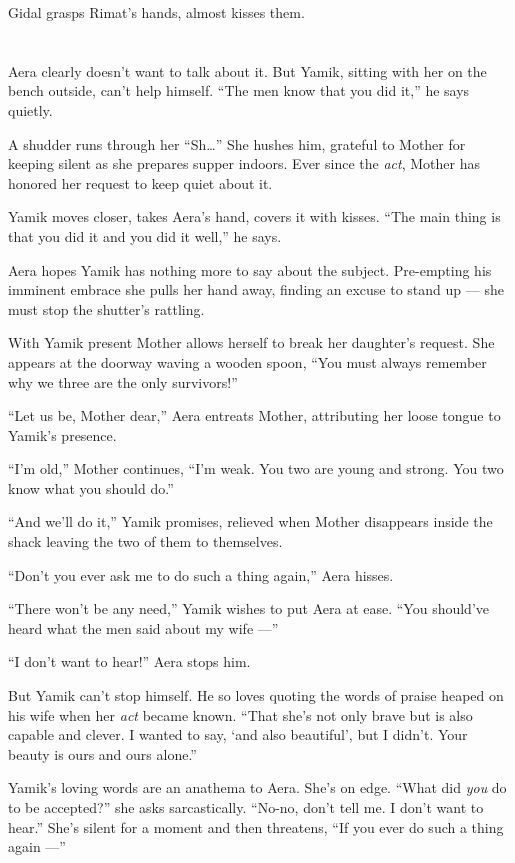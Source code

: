 \documentclass[twoside,11pt,openany]{book}
\begin{document}
Gidal grasps Rimat's hands, almost kisses them.


\bigskip

\chapter{}

Aera clearly doesn't want to talk about it. But Yamik, sitting with her on the bench outside, can't help
himself.  ``The men know that you did it,'' he says quietly.

A shudder runs through her ``Sh{\ldots}''  She hushes him, grateful to Mother for keeping
silent as she prepares supper indoors.  Ever since the \textit{act}, Mother
has honored her request to keep quiet
about it.

Yamik moves closer, takes Aera's hand, covers it with kisses. ``The main thing is that you did it and you
did it well,'' he says.

Aera hopes Yamik has nothing more to say about the subject. Pre-empting his imminent embrace she pulls her hand away,
finding an excuse to stand up --- she must stop the shutter's rattling.

With Yamik present Mother allows herself to break her daughter's request. She appears at the doorway waving a wooden
spoon, ``You must always remember why we three are the only survivors!''

``Let us be, Mother dear,'' Aera entreats Mother, attributing her loose tongue to Yamik's
presence.

``I'm old,'' Mother continues, ``I'm weak. You two are young and strong. You two
know what you should do.''

``And we'll do it,'' Yamik promises, relieved when Mother disappears inside the shack leaving
the two of them to themselves.

``Don't you ever ask me to do such a thing again,'' Aera hisses.

``There won't be any need,'' Yamik wishes to put Aera at ease. ``You should've
heard what the men said about my wife ---''

``I don't want to hear!''  Aera stops him.

But Yamik can't stop himself. He so loves quoting the words of praise heaped on his wife when her \textit{act} became
known. ``That she's not only brave but is also capable and clever. I wanted to say, `and also beautiful',
but I didn't. Your beauty is ours and ours alone.''

Yamik's loving words are an anathema to Aera. She's on edge. ``What did \textit{you} do to be
accepted?'' she asks sarcastically. ``No-no, don't tell me. I don't want to
hear.'' She's silent for a moment and then threatens, ``If you ever do such a thing again
---''
\end{document}
